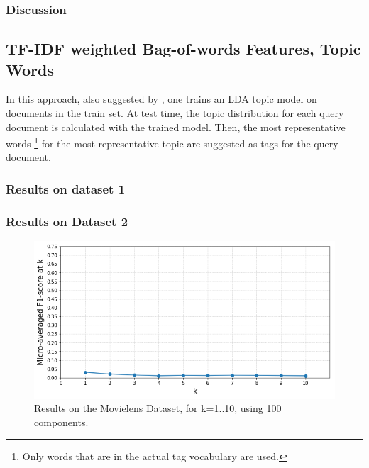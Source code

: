 \subsubsection{Discussion}

\subsection{TF-IDF weighted Bag-of-words Features, Topic Words}

In this approach, also suggested by \cite{choubey_2011}, one trains an LDA topic model on documents in the train set. At test time, the topic distribution for each query document is calculated with the trained model. Then, the most representative words \footnote{Only words that are in the actual tag vocabulary are used.} for the most representative topic are suggested as tags for the query document.

\subsubsection{Results on dataset 1}

\subsubsection{Results on Dataset 2}

\begin{figure}[H]
    \centering
    \includegraphics[width=\textwidth]{chapters/05_experiments/images/topic-words-100d-movielens.png}
    \caption{Results on the Movielens Dataset, for k=1..10, using 100 components.}
    \label{fig:ovr_svm_movielens}
\end{figure}

